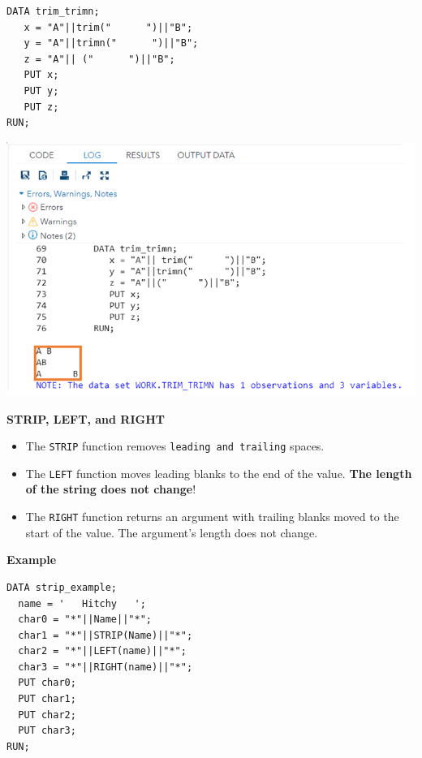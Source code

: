 \documentclass[
]{book}
\begin{document}
\begin{verbatim}
DATA trim_trimn;
   x = "A"||trim("      ")||"B";
   y = "A"||trimn("      ")||"B";
   z = "A"|| ("      ")||"B";
   PUT x;
   PUT y;
   PUT z;
RUN;
\end{verbatim}

\begin{center}\includegraphics[width=1\linewidth]{img10/w10-trim-trimn} \end{center}

\textbf{STRIP, LEFT, and RIGHT}

\begin{itemize}
\item
  The \texttt{STRIP} function removes \texttt{leading\ and\ trailing} spaces.
\item
  The \texttt{LEFT} function moves leading blanks to the end of the value. \textbf{The length of the string does not change}!
\item
  The \texttt{RIGHT} function returns an argument with trailing blanks moved to the start of the value. The argument's length does not change.
\end{itemize}

\textbf{Example}

\begin{verbatim}
DATA strip_example;
  name = '   Hitchy   ';
  char0 = "*"||Name||"*";
  char1 = "*"||STRIP(Name)||"*";
  char2 = "*"||LEFT(name)||"*";
  char3 = "*"||RIGHT(name)||"*";
  PUT char0;
  PUT char1;
  PUT char2;
  PUT char3;
RUN;
\end{verbatim}
\end{document}
